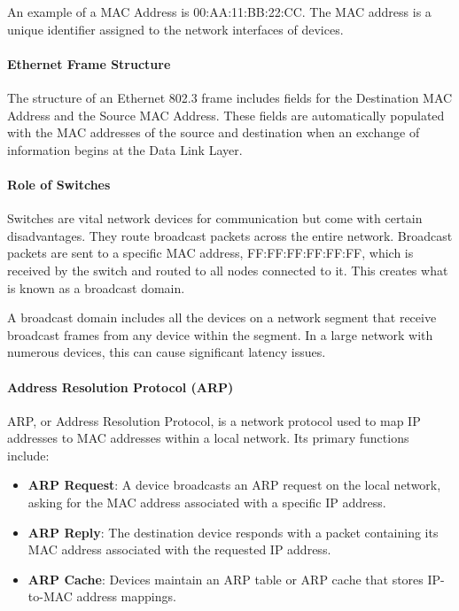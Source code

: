 An example of a MAC Address is 00:AA:11:BB:22:CC. The MAC address is a unique identifier assigned to the network interfaces of devices.

\paragraph{Ethernet Frame Structure}
The structure of an Ethernet 802.3 frame includes fields for the Destination MAC Address and the Source MAC Address. These fields are automatically populated with the MAC addresses of the source and destination when an exchange of information begins at the Data Link Layer.

\paragraph{Role of Switches}
Switches are vital network devices for communication but come with certain disadvantages. They route broadcast packets across the entire network. Broadcast packets are sent to a specific MAC address, FF:FF:FF:FF:FF:FF, which is received by the switch and routed to all nodes connected to it. This creates what is known as a broadcast domain.

A broadcast domain includes all the devices on a network segment that receive broadcast frames from any device within the segment. In a large network with numerous devices, this can cause significant latency issues.

\paragraph{Address Resolution Protocol (ARP)}
ARP, or Address Resolution Protocol, is a network protocol used to map IP addresses to MAC addresses within a local network. Its primary functions include:

\begin{itemize}
    \item \textbf{ARP Request}: A device broadcasts an ARP request on the local network, asking for the MAC address associated with a specific IP address.
    \item \textbf{ARP Reply}: The destination device responds with a packet containing its MAC address associated with the requested IP address.
    \item \textbf{ARP Cache}: Devices maintain an ARP table or ARP cache that stores IP-to-MAC address mappings.
\end{itemize}


